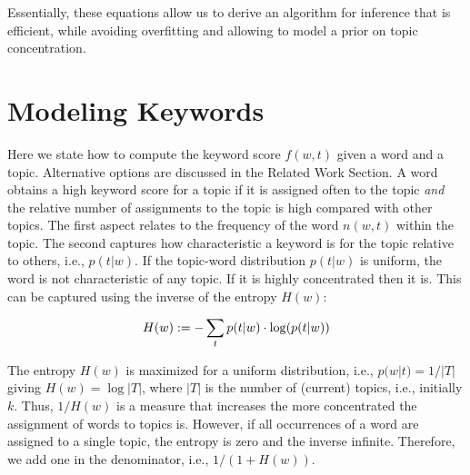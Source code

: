 \documentclass[twocolumn,10]{article}
\begin{document}
	Essentially, these equations allow us to derive an algorithm for inference that is efficient, while avoiding overfitting and allowing to model a prior on topic concentration.  %
	
	\section{Modeling Keywords} \label{sec:comp}
	Here we state how to compute the keyword score $f(w,t)$ given a word and a topic. Alternative options are discussed in the Related Work Section.
	A word obtains a high keyword score for a topic if it is assigned often to the topic \emph{and} the relative number of assignments to the topic is high compared with other topics. The first aspect relates to the frequency of the word $n(w,t)$ within the topic. The second captures how characteristic a keyword is for the topic relative to others, i.e., $p(t|w)$. If the topic-word distribution $p(t|w)$ is uniform, the word is not characteristic of any topic. If it is highly concentrated then it is. This can be captured using the inverse of the entropy $H(w)$: %
	\begin{small}
		\vspace{-6pt}
		\begin{equation} \begin{aligned}
		H(w):=-\sum_t p(t|w)\cdot \log(p(t|w))
		\vspace{-14pt}		
		\end{aligned}  \label{eq:ptw} \end{equation}
	\end{small}
	\noindent The entropy $H(w)$ is maximized for a uniform distribution, i.e., $p(w|t)=1/|T|$ giving $H(w)=\log |T|$, where $|T|$ is the number of (current) topics, i.e., initially $k$. Thus, $1/H(w)$ is a measure that increases the more concentrated the assignment of words to topics is. However, if all occurrences of a word are assigned to a single topic, the entropy is zero and the inverse infinite. Therefore, we add one in the denominator, i.e., $1/(1+H(w))$. 
\end{document}
